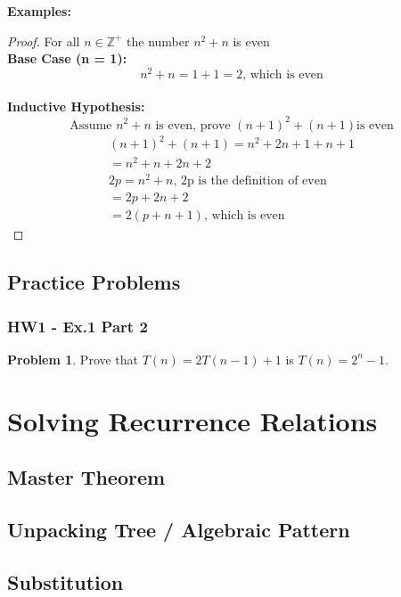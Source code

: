 \documentclass[12pt]{article}
\theoremstyle{definition}
\newtheorem{practiceproblem}{Problem}[section]
\def\scratchwork{\vspace*{15em}} %
\newenvironment{problem}
	{\noindent\begin{minipage}{\textwidth}\begin{practiceproblem}}
	{\scratchwork\end{practiceproblem}\end{minipage}}
\begin{document}
	\noindent \textbf{Examples:}

	\begin{proof} For all $n \in \mathbb{Z}^+$ the number $n^2 + n$ is even \\
		\textbf{Base Case (n = 1):} 
		$$n^2 + n = 1 + 1 = 2\text{, which is even}$$ \\
		\textbf{Inductive Hypothesis:}
		$$\text{Assume }n^2 + n\text{ is even, prove }(n + 1)^2 + (n + 1)\text{
		is even}$$
		\begin{gather}
			(n + 1)^2 + (n + 1) = n^2 + 2n + 1 + n + 1 \\
			= n^2 + n + 2n + 2 \\
			2p = n^2 + n\text{, 2p is the definition of even} \\
			= 2p + 2n + 2 \\
			= 2(p + n + 1)\text{, which is even}
		\end{gather}
	\end{proof}


	\subsection{Practice Problems}

	\subsubsection{HW1 - Ex.1 Part 2}

	\begin{problem}
		Prove that $T(n) = 2T(n - 1) + 1$ is $T(n) = 2^n - 1$.
	\end{problem}


	\section{Solving Recurrence Relations}

	\subsection{Master Theorem}

	\subsection{Unpacking Tree / Algebraic Pattern}

	\subsection{Substitution}
\end{document}
